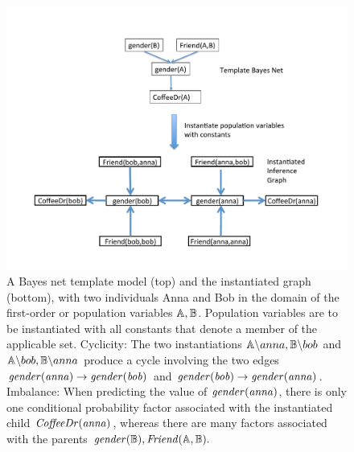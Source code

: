 \documentclass[twoside,11pt]{article}
\begin{document}
\begin{figure}[htbp]
\vspace{-2.2cm}
\begin{center}
\includegraphics[width = 0.7 \textwidth]{figures/recurse-bn}

\caption{A Bayes net template model (top) and the instantiated graph (bottom), with two individuals Anna and Bob in the domain of the first-order or population variables $\mathbb{A},\mathbb{B}$. Population variables are to be instantiated with all constants that denote a member of the applicable set. 
 Cyclicity: The two instantiations $\mathbb{A}\backslash anna,\mathbb{B} \backslash bob$ and $\mathbb{A}\backslash bob,\mathbb{B}\backslash anna$ produce a cycle involving the two  edges $\it{gender}(anna) \rightarrow \it{gender}(bob)$ and $\it{gender}(bob) \rightarrow \it{gender}(anna)$. Imbalance: When predicting the value of $\it{gender}(anna)$, there is only one conditional probability factor associated with the instantiated child $\it{CoffeeDr}(anna)$, whereas there are many factors associated with the parents  $ \it{gender}(\mathbb{B}),\it{Friend}(\mathbb{A},\mathbb{B}).$
\label{fig:recurse-bn}}
\end{center}

\end{figure}
\end{document}
